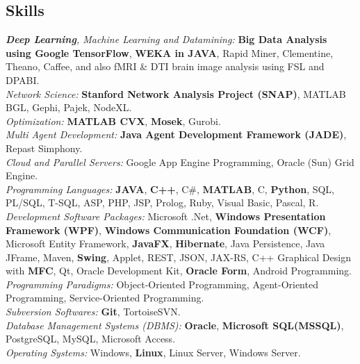 \documentclass[letter]{res}
\begin{document}
\begin{resume}
		\section{Skills}
		{\sl \textbf{Deep Learning}, Machine Learning and Datamining: }\textbf{Big Data Analysis using Google TensorFlow}, \textbf{WEKA in JAVA}, Rapid Miner, Clementine, Theano, Caffee, and also fMRI \& DTI brain image analysis using FSL and DPABI.\\
		{\sl Network Science: }\textbf{Stanford Network Analysis Project (SNAP)}, MATLAB BGL, Gephi, Pajek, NodeXL.\\
		{\sl Optimization: }\textbf{MATLAB CVX}, \textbf{Mosek}, Gurobi.\\
		{\sl Multi Agent Development: }\textbf{Java Agent Development Framework (JADE)}, Repast Simphony.\\
		{\sl Cloud and Parallel Servers: }Google App Engine Programming, Oracle (Sun) Grid Engine.\\
		\textit{Programming Languages: }\textbf{JAVA}, \textbf{C++}, C\#, \textbf{MATLAB}, C, \textbf{Python}, SQL, PL/SQL, T-SQL, ASP, PHP, JSP, Prolog, Ruby, Visual Basic, Pascal, R.\\
		\textit{Development Software Packages: }Microsoft .Net, \textbf{Windows Presentation Framework (WPF)}, \textbf{Windows Communication Foundation (WCF)}, Microsoft Entity Framework, \textbf{JavaFX}, \textbf{Hibernate}, Java Persistence, Java JFrame, Maven, \textbf{Swing}, Applet, REST, JSON, JAX-RS, C++ Graphical Design with \textbf{MFC}, Qt, Oracle Development Kit, \textbf{Oracle Form}, Android Programming.\\
		\textit{Programming Paradigms: }Object-Oriented Programming, Agent-Oriented Programming, Service-Oriented Programming.\\
		\textit{Subversion Softwares: }\textbf{Git}, TortoiseSVN.\\
		\textit{Database Management Systems (DBMS): }\textbf{Oracle}, \textbf{Microsoft SQL(MSSQL)}, PostgreSQL, MySQL, Microsoft Access.\\
		\textit{Operating Systems: }Windows, \textbf{Linux}, Linux Server, Windows Server.
		

\end{resume}
\end{document}
